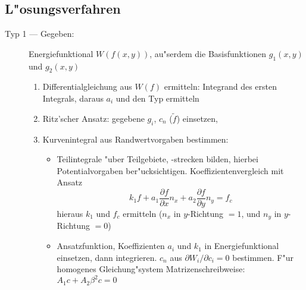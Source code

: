 \subsection{L"osungsverfahren}
\begin{description}

\item[Typ 1 --- Gegeben:] Energiefunktional $W(f(x,y))$, au"serdem die
     Basisfunktionen $g_1(x,y)$ und $g_2(x,y)$
   \begin{enumerate}
   \item Differentialgleichung aus $W(f)$ ermitteln: Integrand des ersten
         Integrals, daraus $a_i$ und den Typ ermitteln
   \item Ritz'scher Ansatz: gegebene $g_i$, $c_n$ ($\tilde{f}$) einsetzen,
   \item Kurvenintegral aus Randwertvorgaben bestimmen:
   \begin{itemize}
     \item Teilintegrale "uber Teilgebiete, -strecken bilden, hierbei
           Potentialvorgaben ber"ucksichtigen.
           Koeffizientenvergleich mit Ansatz $$k_1f+a_1\frac{\partial
           f}{\partial x}n_x+a_2\frac{\partial f}{\partial y}n_y=f_c$$
           hieraus $k_1$ und $f_c$ ermitteln ($n_x$ in $y$-Richtung $=1$, und
           $n_y$ in $y$-Richtung $=0$)
     \item Ansatzfunktion, Koeffizienten $a_i$ und $k_1$ in Energiefunktional
           einsetzen, dann integrieren. $c_n$ aus $\partial W_i/\partial c_i =0$
           bestimmen. F"ur homogenes Gleichung"system Matrizenschreibweise:
           $A_1 c + A_2 \beta^2 c = 0$
   \end{itemize}
   \end{enumerate}


\end{description}

